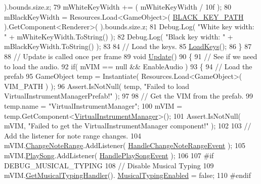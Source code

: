 \begin{DoxyCodeInclude}
      ).bounds.size.z;
79         mWhiteKeyWidth += ( mWhiteKeyWidth / 10f );
80         mBlackKeyWidth = Resources.Load<GameObject>( \hyperlink{group___key_contain_const_gac968b0d398c545a13abad255d8287825}{BLACK\_KEY\_PATH} ).GetComponent<Renderer>(
      ).bounds.size.z;
81         Debug.Log( \textcolor{stringliteral}{"White key width: "} + mWhiteKeyWidth.ToString() );
82         Debug.Log( \textcolor{stringliteral}{"Black key width: "} + mBlackKeyWidth.ToString() );
83 
84         \textcolor{comment}{// Load the keys.}
85         \hyperlink{group___key_contain_priv_func_ga65f79700f265d2223681ac95981ab4a3}{LoadKeys}();      
86     \}
87     
88     \textcolor{comment}{// Update is called once per frame}
89     \textcolor{keywordtype}{void} \hyperlink{group___key_contain_unity_gae0e513a4ef9fd25c1e0f5f3bc53d9b5c}{Update}()
90     \{
91         \textcolor{comment}{// See if we need to load the audio.}
92         \textcolor{keywordflow}{if}( mVIM == null && EnableAudio )
93         \{
94             \textcolor{comment}{// Load the prefab}
95             GameObject temp = Instantiate( Resources.Load<GameObject>( VIM\_PATH ) );
96             Assert.IsNotNull( temp, \textcolor{stringliteral}{"Failed to load VirtualInstrumentManagerPrefab!"} );
97 
98             \textcolor{comment}{// Get the VIM from the prefab.}
99             temp.name = \textcolor{stringliteral}{"VirtualInstrumentManager"};
100             mVIM = temp.GetComponent<\hyperlink{class_virtual_instrument_manager}{VirtualInstrumentManager}>();
101             Assert.IsNotNull( mVIM, \textcolor{stringliteral}{"Failed to get the VirtualInstrumentManager component!"} );
102 
103             \textcolor{comment}{// Add the listener for note range changes.}
104             mVIM.\hyperlink{group___v_i_m_events_gab6fa99d08e8466406835b9fc4ff859f1}{ChangeNoteRange}.AddListener( 
      \hyperlink{group___key_contain_handlers_ga0d82098e4f886f77a33f9d5ed13fe195}{HandleChangeNoteRangeEvent} );
105             mVIM.\hyperlink{group___v_i_m_events_gae450bdba9c513ab4e43f69def50fa84d}{PlaySong}.AddListener( \hyperlink{group___key_contain_handlers_ga894c823059c5268af0954f83c04036ed}{HandlePlaySongEvent} );
106 
107 \textcolor{preprocessor}{            #if DEBUG\_MUSICAL\_TYPING}
108                 \textcolor{comment}{// Disable Musical Typing}
109                 mVIM.\hyperlink{group___v_i_m_pub_func_gae6701458a23a3f14db90501f871d4d0d}{GetMusicalTypingHandler}().
      \hyperlink{group___mus_typ_pub_var_ga09a764161d537b31fac1a64ee5d39625}{MusicalTypingEnabled} = \textcolor{keyword}{false};
110 \textcolor{preprocessor}{            #endif}

\end{DoxyCodeInclude}
